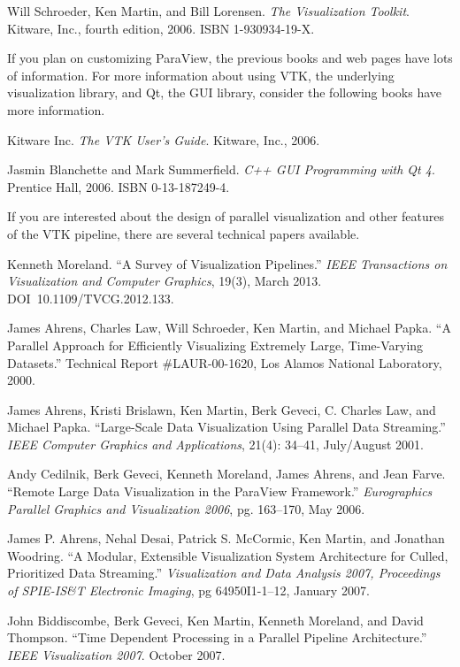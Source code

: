 \begin{reflist}
\item Will Schroeder, Ken Martin, and Bill Lorensen.  \emph{The
  Visualization Toolkit}.  Kitware, Inc., fourth edition, 2006.  ISBN
  1-930934-19-X.
\end{reflist}

If you plan on customizing ParaView, the previous books and web pages have
lots of information.  For more information about using VTK, the underlying
visualization library, and Qt, the GUI library, consider the following
books have more information.

\begin{reflist}
\item Kitware Inc.  \emph{The VTK User's Guide}.  Kitware, Inc., 2006.
\item Jasmin Blanchette and Mark Summerfield.  \emph{C++ GUI Programming
  with Qt 4}.  Prentice Hall, 2006.  ISBN 0-13-187249-4.
\end{reflist}

If you are interested about the design of parallel visualization and other
features of the VTK pipeline, there are several technical papers available.

\begin{reflist}
\item Kenneth Moreland. ``A Survey of Visualization Pipelines.'' \emph{IEEE
  Transactions on Visualization and Computer Graphics}, 19(3), March 2013.
  DOI~10.1109/TVCG.2012.133.
\item James Ahrens, Charles Law, Will Schroeder, Ken Martin, and Michael
  Papka.  ``A Parallel Approach for Efficiently Visualizing Extremely Large,
  Time-Varying Datasets.''  Technical Report \#LAUR-00-1620, Los Alamos
  National Laboratory, 2000.
\item James Ahrens, Kristi Brislawn, Ken Martin, Berk Geveci, C. Charles
  Law, and Michael Papka.  ``Large-Scale Data Visualization Using Parallel
  Data Streaming.''  \emph{IEEE Computer Graphics and Applications}, 21(4):
  34--41, July/August 2001.
\item Andy Cedilnik, Berk Geveci, Kenneth Moreland, James Ahrens, and Jean
  Farve.  ``Remote Large Data Visualization in the ParaView Framework.''
  \emph{Eurographics Parallel Graphics and Visualization 2006},
  pg. 163--170, May 2006.
\item James P. Ahrens, Nehal Desai, Patrick S. McCormic, Ken Martin, and
  Jonathan Woodring.  ``A Modular, Extensible Visualization System
  Architecture for Culled, Prioritized Data Streaming.''
  \emph{Visualization and Data Analysis 2007, Proceedings of SPIE-IS\&T
    Electronic Imaging}, pg 64950I1-1--12, January 2007.
\item John Biddiscombe, Berk Geveci, Ken Martin, Kenneth Moreland, and
  David Thompson.  ``Time Dependent Processing in a Parallel Pipeline
  Architecture.'' \emph{IEEE Visualization 2007}.  October 2007.
\end{reflist}

